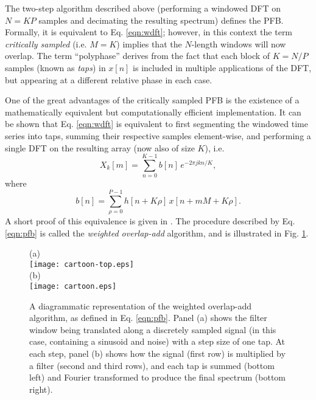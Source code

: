 \documentclass{pasa}%
\begin{document}
The two-step algorithm described above (performing a windowed DFT on $N = KP$ samples and decimating the resulting spectrum) defines the PFB.
Formally, it is equivalent to Eq. \eqref{eqn:wdft}; however, in this context the term \textit{critically sampled} (i.e. $M = K$) implies that the $N$-length windows will now overlap.
The term ``polyphase'' derives from the fact that each block of $K = N/P$ samples (known as \textit{taps}) in $x[n]$ is included in multiple applications of the DFT, but appearing at a different relative phase in each case.

One of the great advantages of the critically sampled PFB is the existence of a mathematically equivalent but computationally efficient implementation.
It can be shown that Eq. \eqref{eqn:wdft} is equivalent to first segmenting the windowed time series into taps, summing their respective samples element-wise, and performing a single DFT on the resulting array (now also of size $K$), i.e.
\begin{equation}
    X_k[m] = \sum_{n=0}^{K-1} b[n]\,e^{-2\pi jkn/K},
    \label{eqn:pfb}
\end{equation}
where
\begin{equation*}
    b[n] = \sum_{\rho=0}^{P-1} h[n + K\rho]\,x[n + mM + K\rho].
\end{equation*}
A short proof of this equivalence is given in \citet{Harris2011}.
The procedure described by Eq. \eqref{eqn:pfb} is called the \textit{weighted overlap-add} algorithm, and is illustrated in Fig. \ref{fig:pfb}.
\begin{figure}[p]
    \centering
    (a) \\
    \texttt{[image: cartoon-top.eps]} \\
    (b) \\
    \texttt{[image: cartoon.eps]}
    \caption{A diagrammatic representation of the weighted overlap-add algorithm, as defined in Eq. \eqref{eqn:pfb}. Panel (a) shows the filter window being translated along a discretely sampled signal (in this case, containing a sinusoid and noise) with a step size of one tap. At each step, panel (b) shows how the signal (first row) is multiplied by a filter (second and third rows), and each tap is summed (bottom left) and Fourier transformed to produce the final spectrum (bottom right).}
    \label{fig:pfb}
\end{figure}

\end{document}
